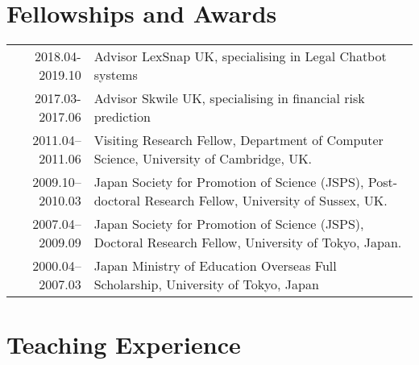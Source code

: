 \documentclass[a4paper,11pt]{article}
\begin{document}
\section{Fellowships and Awards}
\begin{tabular}{r p{11cm}}
\textsc{2018.04-2019.10} & Advisor LexSnap UK, specialising in Legal Chatbot systems\\
\textsc{2017.03-2017.06} & Advisor Skwile UK, specialising in financial risk prediction \\
\textsc{2011.04--2011.06} & Visiting Research Fellow, Department of Computer Science, University of Cambridge, UK. \\
\textsc{2009.10--2010.03} & Japan Society for Promotion of Science (JSPS), Post-doctoral Research Fellow, University of Sussex, UK. \\
\textsc{2007.04--2009.09} & Japan Society for Promotion of Science (JSPS), Doctoral Research Fellow, University of Tokyo, Japan.\\
\textsc{2000.04--2007.03} & Japan Ministry of Education Overseas Full Scholarship, University of Tokyo, Japan
\end{tabular}


\section{Teaching Experience}
\end{document}
